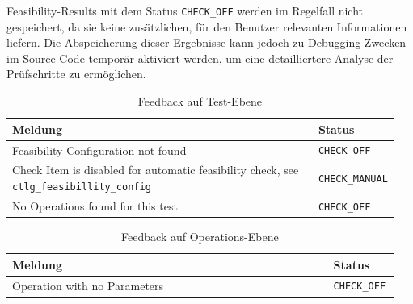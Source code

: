 Feasibility-Results mit dem Status \texttt{CHECK\_OFF} werden im Regelfall nicht gespeichert, da sie keine zusätzlichen, für den Benutzer relevanten Informationen liefern. Die Abspeicherung dieser Ergebnisse kann jedoch zu Debugging-Zwecken im Source Code temporär aktiviert werden, um eine detailliertere Analyse der Prüfschritte zu ermöglichen.


\begin{table}[!htb]
    \centering
    \caption{Feedback auf Test-Ebene}
    \footnotesize
    \renewcommand{\arraystretch}{1.1} %
    \setlength{\arrayrulewidth}{0.1pt} %
    \begin{tabular}{p{0.8\linewidth} p{0.15\linewidth}}
        \textbf{Meldung} & \textbf{Status} \\
        \midrule
        Feasibility Configuration not found & \texttt{CHECK\_OFF} \\
        \midrule
        Check Item is disabled for automatic feasibility check, see \texttt{ctlg\_feasibillity\_config} & \texttt{CHECK\_MANUAL} \\
        \midrule
        No Operations found for this test & \texttt{CHECK\_OFF} \\
        \bottomrule
    \end{tabular}
    \label{tab:feedback-test}
\end{table}


\begin{table}[!htb]
    \centering
    \caption{Feedback auf Operations-Ebene}
    \footnotesize
    \renewcommand{\arraystretch}{1.1}
    \begin{tabular}{p{0.8\linewidth} p{0.15\linewidth}}
        \textbf{Meldung} & \textbf{Status} \\
        \midrule
        Operation with no Parameters & \texttt{CHECK\_OFF} \\
        \bottomrule
    \end{tabular}
    \label{tab:feedback-operation}
\end{table}



